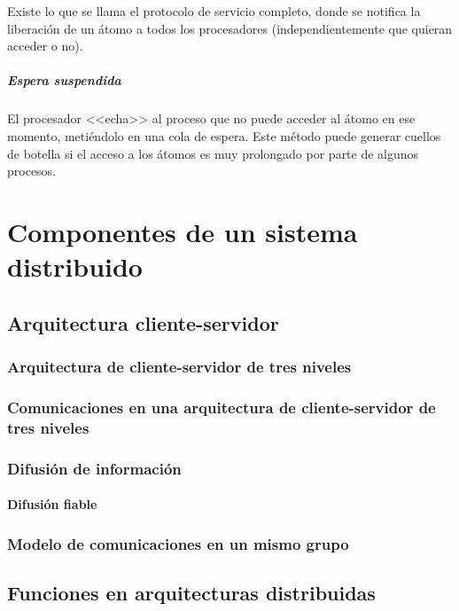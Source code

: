\documentclass[a4paper, 11pt, titlepage]{article}
\begin{document}
                        Existe lo que se llama el protocolo de servicio completo, donde se notifica 
                        la liberación de un átomo a todos los procesadores (independientemente que 
                        quieran acceder o no).

                    \subparagraph{Espera suspendida}

                        El procesador <<echa>> al proceso que no puede acceder al átomo en ese momento, 
                        metiéndolo en una cola de espera. Este método puede generar cuellos de botella 
                        si el acceso a los átomos es muy prolongado por parte de algunos procesos.

\section{Componentes de un sistema distribuido}

    \subsection{Arquitectura cliente-servidor}

        \subsubsection{Arquitectura de cliente-servidor de tres niveles}

        \subsubsection{Comunicaciones en una arquitectura de cliente-servidor de tres niveles}

        \subsubsection{Difusión de información}

            \paragraph{Difusión fiable}
        
        \subsubsection{Modelo de comunicaciones en un mismo grupo}

    \subsection{Funciones en arquitecturas distribuidas}
\end{document}

